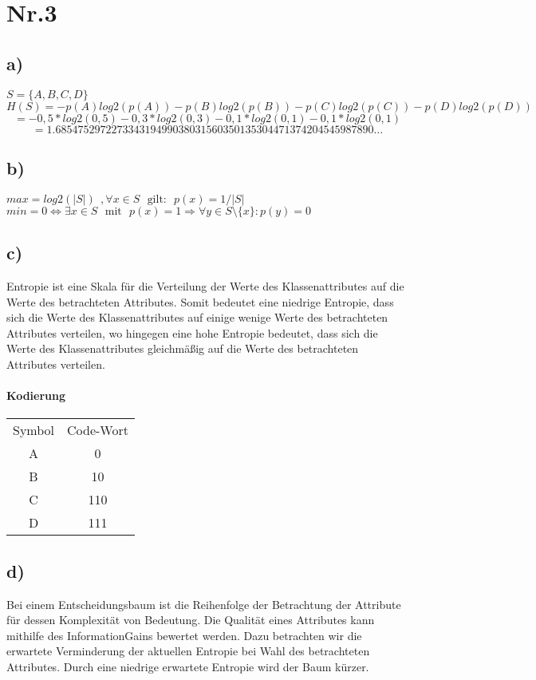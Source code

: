 \documentclass[a4paper,11pt,twoside]{article}
\begin{document}
\section*{Nr.3}
\subsection*{a)}
$S = \{A,B,C,D\}$ 
\[ H(S) = -p(A)log2(p(A))-p(B)log2(p(B))-p(C)log2(p(C))-p(D)log2(p(D)) \]
\[ = -0,5*log2(0,5)-0,3*log2(0,3)-0,1*log2(0,1)-0,1*log2(0,1) \]
\[ = 1.685475297227334319499038031560350135304471374204545987890...\]

\subsection*{b)}
$max = log2(|S|)~~,\forall x \in S ~~~\text{gilt:}~~~ p(x) = 1/|S|$\\
$min = 0 \Leftrightarrow \exists x \in S ~~~\text{mit}~~~ p(x) = 1  \Rightarrow \forall y \in S \setminus \{x\} : p(y) = 0$

\subsection*{c)}
Entropie ist eine Skala für die Verteilung der Werte des Klassenattributes auf die Werte des betrachteten Attributes. Somit bedeutet eine niedrige Entropie, dass sich die Werte des Klassenattributes auf einige wenige Werte des betrachteten Attributes verteilen, wo hingegen eine hohe Entropie bedeutet, dass sich die Werte des Klassenattributes gleichmäßig auf die Werte des betrachteten Attributes verteilen.
\paragraph{Kodierung}
\begin{tabular}{cc}
	Symbol & Code-Wort \\
	A & 0\\
	B & 10\\
	C & 110\\
	D & 111
\end{tabular}

\subsection*{d)}
Bei einem Entscheidungsbaum ist die Reihenfolge der Betrachtung der Attribute für dessen Komplexität von Bedeutung. Die Qualität  eines Attributes kann mithilfe des InformationGains bewertet werden. Dazu betrachten wir die erwartete Verminderung der aktuellen Entropie bei Wahl des betrachteten Attributes. Durch eine niedrige erwartete Entropie wird der Baum kürzer. 
\end{document}
